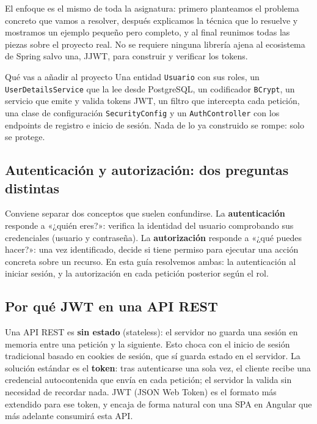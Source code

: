 \documentclass[11pt]{article}
\begin{document}
El enfoque es el mismo de toda la asignatura: primero planteamos el problema concreto que vamos a resolver, después explicamos la técnica que lo resuelve y mostramos un ejemplo pequeño pero completo, y al final reunimos todas las piezas sobre el proyecto real. No se requiere ninguna librería ajena al ecosistema de Spring salvo una, JJWT, para construir y verificar los tokens.

\begin{cajatip}{Qué vas a añadir al proyecto}
Una entidad \texttt{Usuario} con sus roles, un \texttt{UserDetailsService} que la lee desde PostgreSQL, un codificador \texttt{BCrypt}, un servicio que emite y valida tokens JWT, un filtro que intercepta cada petición, una clase de configuración \texttt{SecurityConfig} y un \texttt{AuthController} con los endpoints de registro e inicio de sesión. Nada de lo ya construido se rompe: solo se protege.\par
\end{cajatip}

\subsection{Autenticación y autorización: dos preguntas distintas}
Conviene separar dos conceptos que suelen confundirse. La \textbf{autenticación} responde a «¿quién eres?»: verifica la identidad del usuario comprobando sus credenciales (usuario y contraseña). La \textbf{autorización} responde a «¿qué puedes hacer?»: una vez identificado, decide si tiene permiso para ejecutar una acción concreta sobre un recurso. En esta guía resolvemos ambas: la autenticación al iniciar sesión, y la autorización en cada petición posterior según el rol.

\subsection{Por qué JWT en una API REST}
Una API REST es \textbf{sin estado} (stateless): el servidor no guarda una sesión en memoria entre una petición y la siguiente. Esto choca con el inicio de sesión tradicional basado en cookies de sesión, que sí guarda estado en el servidor. La solución estándar es el \textbf{token}: tras autenticarse una sola vez, el cliente recibe una credencial autocontenida que envía en cada petición; el servidor la valida sin necesidad de recordar nada. JWT (JSON Web Token) es el formato más extendido para ese token, y encaja de forma natural con una SPA en Angular que más adelante consumirá esta API.
\end{document}
